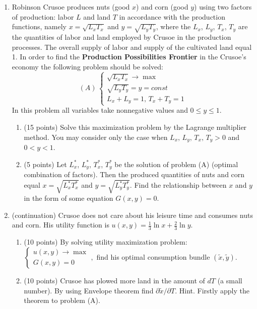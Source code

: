 \documentclass[12pt]{article} %
\theoremstyle{definition} %
\begin{document}
\begin{enumerate}[resume]
\item Robinson Crusoe produces nuts (good $x$) and corn (good $y$) using two factors of production: labor $L$ and land $T$ in accordance with the production functions, namely $x=\sqrt{L_x T_x}$ and $y=\sqrt{L_y T_y}$, where the $L_x$, $L_y$, $T_x$, $T_y$ are the quantities of labor and land employed by Crusoe in the production processes. The overall supply of labor and supply of the cultivated land equal 1. In order to find the \textbf{Production Possibilities Frontier} in the Crusoe’s economy the following problem should be solved:
\[
(A)\,
\begin{cases}
	\sqrt{L_x T_x} \to \max \\
	\sqrt{L_y T_y}=y=const \\
	L_x + L_y = 1, \, T_x + T_y = 1
\end{cases}
\]
In this problem all variables take nonnegative values and $0\leq y\leq 1$.

\begin{enumerate}
\item (15 points) Solve this maximization problem by the Lagrange multiplier method. You may consider only the case when $L_x,\, L_y,\, T_x, \, T_y>0$  and $0<y<1$.
\item (5 points) Let $L_x^*$, $L_y^*$, $T_x^*$, $T_y^*$ be the solution of problem (A) (optimal combination of factors). Then the produced quantities of nuts and corn equal $x=\sqrt{L_x^* T_x^*}$ and $y=\sqrt{L_y^* T_y^*}$. Find the relationship between $x$ and $y$ in the form of some equation $G(x,y)=0$.
\end{enumerate}

\item (continuation) Crusoe does not care about his leisure time and consumes nuts and corn. His utility function is $u(x,y)=\frac{1}{3}\ln x + \frac{2}{3}\ln y$.

\begin{enumerate}
\item (10 points) By solving utility maximization problem:
$
\begin{cases}
u(x,y) \to \max \\
G(x,y)=0
\end{cases},
$ find his optimal consumption bundle $(\tilde{x},\tilde{y})$.
\item (10 points) Crusoe has plowed more land in the amount of $dT$ (a small number). By using Envelope theorem find $\partial \tilde{x}/\partial T$. Hint. Firstly apply the theorem to problem (A).
\end{enumerate}

\end{enumerate}
\end{document}
